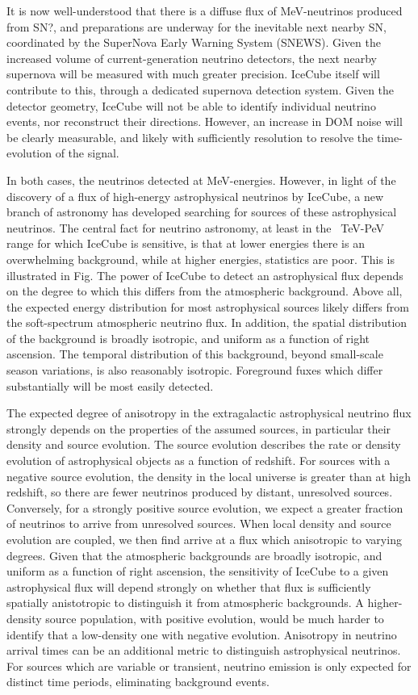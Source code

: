 It is now well-understood that there is a diffuse flux of MeV-neutrinos produced from SN?, and preparations are underway for the inevitable next nearby SN, coordinated by the SuperNova Early Warning System (SNEWS). Given the increased volume of current-generation neutrino detectors, the next nearby supernova will be measured with much greater precision. IceCube itself will contribute to this, through a dedicated supernova detection system. Given the detector geometry, IceCube will not be able to identify individual neutrino events, nor reconstruct their directions. However, an increase in DOM noise will be clearly measurable, and likely with sufficiently resolution to resolve the time-evolution of the signal. 

In both cases, the neutrinos detected at MeV-energies.  However, in light of the discovery of a flux of high-energy astrophysical neutrinos by IceCube, a new branch of astronomy has developed searching for sources of these astrophysical neutrinos. The central fact for neutrino astronomy, at least in the ~TeV-PeV range for which IceCube is sensitive, is that at lower energies there is an overwhelming background, while at higher energies, statistics are poor. This is illustrated in Fig. The power of IceCube to detect an astrophysical flux depends on the degree to which this differs from the atmospheric background. Above all, the expected energy distribution for most astrophysical sources likely differs from the soft-spectrum atmospheric neutrino flux. In addition, the spatial distribution of the background is broadly isotropic, and uniform as a function of right ascension. The temporal distribution of this background, beyond small-scale season variations, is also reasonably isotropic. Foreground fuxes which differ substantially will be most easily detected.

The expected degree of anisotropy in the extragalactic astrophysical neutrino flux strongly depends on the properties of the assumed sources, in particular their density and source evolution. The source evolution describes the rate or density evolution of astrophysical objects as a function of redshift. For sources with a negative source evolution, the density in the local universe is greater than at high redshift, so there are fewer neutrinos produced by distant, unresolved sources. Conversely, for a strongly positive source evolution, we expect a greater fraction of neutrinos to arrive from unresolved sources. When local density and source evolution are coupled, we then find arrive at a flux which anisotropic to varying degrees. Given that the atmospheric backgrounds are broadly isotropic, and uniform as a function of right ascension, the sensitivity of IceCube to a given astrophysical flux will depend strongly on whether that flux is sufficiently spatially anistotropic to distinguish it from atmospheric backgrounds. A higher-density source population, with positive evolution, would be much harder to identify that a low-density one with negative evolution. Anisotropy in neutrino arrival times can be an additional metric to distinguish astrophysical neutrinos. For sources which are variable or transient, neutrino emission is only expected for distinct time periods, eliminating background events.


